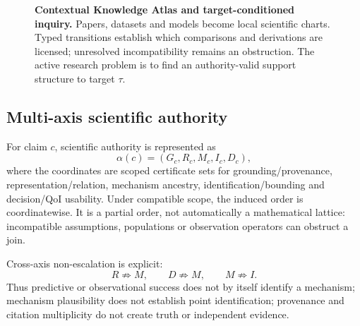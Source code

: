 \documentclass[11pt]{article}
\begin{document}
\begin{figure}[t]
{}
\caption{\textbf{Contextual Knowledge Atlas and target-conditioned inquiry.} Papers, datasets and models become local scientific charts. Typed transitions establish which comparisons and derivations are licensed; unresolved incompatibility remains an obstruction. The active research problem is to find an authority-valid support structure to target $\tau$.}
\label{fig:atlas}
\end{figure}

\subsection{Multi-axis scientific authority}
For claim $c$, scientific authority is represented as
\begin{equation}\alpha(c)=(G_c,R_c,M_c,I_c,D_c),\end{equation}
where the coordinates are scoped certificate sets for grounding/provenance, representation/relation, mechanism ancestry, identification/bounding and decision/QoI usability. Under compatible scope, the induced order is coordinatewise. It is a partial order, not automatically a mathematical lattice: incompatible assumptions, populations or observation operators can obstruct a join.

Cross-axis non-escalation is explicit:
\begin{equation}R\not\Rightarrow M,\qquad D\not\Rightarrow M,\qquad M\not\Rightarrow I.\end{equation}
Thus predictive or observational success does not by itself identify a mechanism; mechanism plausibility does not establish point identification; provenance and citation multiplicity do not create truth or independent evidence.
\end{document}
